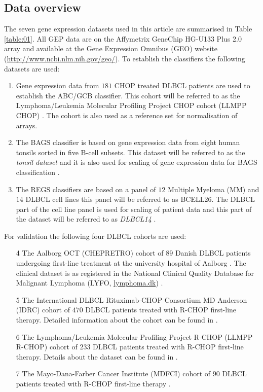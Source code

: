 \documentclass{article}
\begin{document}
\subsection{Data overview}
The seven gene expression datasets used in this article are summarised in Table \ref{table:01}.
All GEP data are on the Affymetrix GeneChip HG-U133 Plus 2.0 array and available at the Gene Expression Omnibus (GEO) \citep{Barrett2013} website (\url{http://www.ncbi.nlm.nih.gov/geo/}).
To establish the classifiers the following datasets are used:
\begin{enumerate}
  \item Gene expression data from $181$ CHOP treated DLBCL patients are used to establish the ABC/GCB classifier.
  This cohort will be referred to as the Lymphoma/Leukemia Molecular Profiling Project CHOP cohort (LLMPP CHOP) \citep{Lenz2008a}.
  The cohort is also used as a reference set for normalisation of arrays.
  \item The BAGS classifier is based on gene expression data from eight human tonsils sorted in five B-cell subsets.
  This dataset will be referred to as the \textit{tonsil dataset} and it is also used for scaling of gene expression data for BAGS classification \citep{DybkaerBoegsted2015}.
  \item The REGS classifiers are based on a panel of $12$ Multiple Myeloma (MM) and $14$ DLBCL cell lines this panel will be referred to as BCELL26.
  The DLBCL part of the cell line panel is used for scaling of patient data and this part of the dataset will be referred to as \textit{DLBCL14} \citep{Falgreen2015}.
\end{enumerate}
For validation the following four DLBCL cohorts are used:
\begin{enumerate}
  \item[4] The Aalborg OCT (CHEPRETRO) cohort of $89$ Danish DLBCL patients undergoing first-line treatment at the university  hospital of Aalborg \citep{DybkaerBoegsted2015}.
  The clinical dataset is as registered in the National Clinical Quality Database for Malignant Lymphoma (LYFO, \url{lymphoma.dk}) \citep{Gang2012}.
  \item[5] The International DLBCL Rituximab-CHOP Consortium MD Anderson (IDRC) cohort of $470$ DLBCL patients treated with R-CHOP first-line therapy.
  Detailed information about the cohort can be found in \citep{Visco2012}.
  \item[6] The Lymphoma/Leukemia Molecular Profiling Project R-CHOP (LLMPP R-CHOP) cohort of $233$ DLBCL patients treated with R-CHOP first-line therapy.
  Details about the dataset can be found in \citep{Lenz2008a}.
  \item[7] The Mayo-Dana-Farber Cancer Institute (MDFCI) cohort of $90$ DLBCL patients treated with R-CHOP first-line therapy \citep{Monti2012a}.
\end{enumerate}
\end{document}
